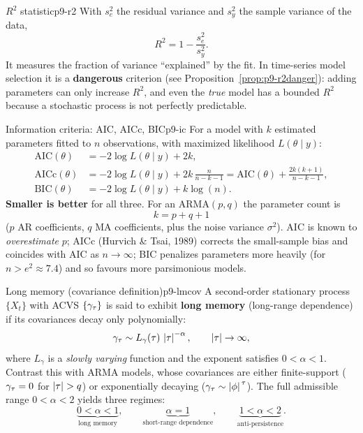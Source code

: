 \begin{definition}{$R^2$ statistic}{p9-r2}
With $s_e^2$ the residual variance and $s_y^2$ the sample variance of the data,
\[
R^2 = 1 - \frac{s_e^2}{s_y^2}.
\]
It measures the fraction of variance ``explained'' by the fit. In time-series
model selection it is a \textbf{dangerous} criterion (see
Proposition~\ref{prop:p9-r2danger}): adding parameters can only increase $R^2$,
and even the \emph{true} model has a bounded $R^2$ because a stochastic process
is not perfectly predictable.
\end{definition}

\begin{definition}{Information criteria: AIC, AICc, BIC}{p9-ic}
For a model with $k$ estimated parameters fitted to $n$ observations, with
maximized likelihood $L(\theta\mid y)$:
\[
\begin{aligned}
\mathrm{AIC}(\theta)  &= -2\log L(\theta\mid y) + 2k, \\[2pt]
\mathrm{AICc}(\theta) &= -2\log L(\theta\mid y) + 2k\,\frac{n}{n-k-1}
                       = \mathrm{AIC}(\theta) + \frac{2k(k+1)}{n-k-1}, \\[2pt]
\mathrm{BIC}(\theta)  &= -2\log L(\theta\mid y) + k\log(n).
\end{aligned}
\]
\textbf{Smaller is better} for all three. For an ARMA$(p,q)$ the parameter count
is
\[
k = p+q+1
\]
($p$ AR coefficients, $q$ MA coefficients, plus the noise variance $\sigma^2$).
AIC is known to \emph{overestimate} $p$; AICc (Hurvich \& Tsai, 1989) corrects
the small-sample bias and coincides with AIC as $n\to\infty$; BIC penalizes
parameters more heavily (for $n>e^2\approx 7.4$) and so favours more
parsimonious models.
\end{definition}

\begin{definition}{Long memory (covariance definition)}{p9-lmcov}
A second-order stationary process $\{X_t\}$ with ACVS $\{\gamma_\tau\}$ is said to
exhibit \textbf{long memory} (long-range dependence) if its covariances decay
only polynomially:
\[
\gamma_\tau \sim L_\gamma(\tau)\,\left\lvert \tau \right\rvert^{-\alpha},\qquad \left\lvert \tau \right\rvert\to\infty,
\]
where $L_\gamma$ is a \emph{slowly varying} function and the exponent satisfies
$0<\alpha<1$. Contrast this with ARMA models, whose covariances are either
finite-support ($\gamma_\tau=0$ for $\left\lvert \tau \right\rvert>q$) or exponentially decaying
($\gamma_\tau\sim\left\lvert \phi \right\rvert^{\,\tau}$). The full admissible range $0<\alpha<2$
yields three regimes:
\[
\underbrace{0<\alpha<1}_{\text{long memory}}, \qquad
\underbrace{\alpha=1}_{\text{short-range dependence}}, \qquad
\underbrace{1<\alpha<2}_{\text{anti-persistence}} .
\]
\end{definition}


